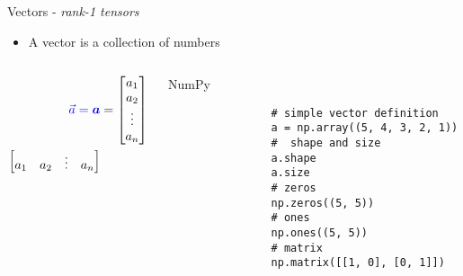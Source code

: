 \documentclass[handout]{beamer}
\begin{document}
\begin{frame}[fragile]{Vectors - \textit{rank-1 tensors}}
    \begin{itemize}
        \item A vector is a collection of numbers
    \end{itemize}
    \begin{columns}
        \begin{column}{0.5\textwidth}
    \large
    \begin{align*} 
        \textcolor{blue}{\vec{a} = \boldsymbol{a}} &= \begin{bmatrix}
           a_{1}  \\
           a_{2}  \\
           \vdots \\
           a_{n}  
         \end{bmatrix}\\
         \begin{bmatrix}
             a_{1}  & a_{2}  & \vdots & a_{n}  
         \end{bmatrix}
    \end{align*}
        \end{column}
        \begin{column}{0.5\textwidth}
            \begin{alertblock}{NumPy}
                \begin{lstlisting}
                # simple vector definition
                a = np.array((5, 4, 3, 2, 1))
                #  shape and size 
                a.shape
                a.size
                # zeros
                np.zeros((5, 5))
                # ones
                np.ones((5, 5))
                # matrix
                np.matrix([[1, 0], [0, 1]])
                \end{lstlisting}
            \end{alertblock}
        \end{column}
    \end{columns}
\end{frame}

\end{document}
